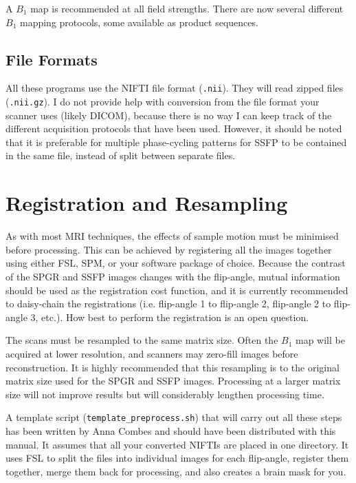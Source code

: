 \documentclass{report}
\begin{document}
A $B_1$ map is recommended at all field strengths. There are now several different $B_1$ mapping protocols, some available as product sequences.

\subsection{File Formats}

All these programs use the NIFTI file format (\texttt{.nii}). They will read zipped files (\texttt{.nii.gz}). I do not provide help with conversion from the file format your scanner uses (likely DICOM), because there is no way I can keep track of the different acquisition protocols that have been used. However, it should be noted that it is preferable for multiple phase-cycling patterns for SSFP to be contained in the same file, instead of split between separate files.

\section{Registration and Resampling}

As with most MRI techniques, the effects of sample motion must be minimised before processing. This can be achieved by registering all the images together using either FSL, SPM, or your software package of choice. Because the contrast of the SPGR and SSFP images changes with the flip-angle, mutual information should be used as the registration cost function, and it is currently recommended to daisy-chain the registrations (i.e. flip-angle 1 to flip-angle 2, flip-angle 2 to flip-angle 3, etc.). How best to perform the registration is an open question.

The scans must be resampled to the same matrix size.  Often the $B_1$ map will be acquired at lower resolution, and scanners may zero-fill images before reconstruction. It is highly recommended that this resampling is to the original matrix size used for the SPGR and SSFP images. Processing at a larger matrix size will not improve results but will considerably lengthen processing time.

A template script (\texttt{template\_preprocess.sh}) that will carry out all these steps has been written by Anna Combes and should have been distributed with this manual. It assumes that all your converted NIFTIs are placed in one directory. It uses FSL to split the files into individual images for each flip-angle, register them together, merge them back for processing, and also creates a brain mask for you.
\end{document}
